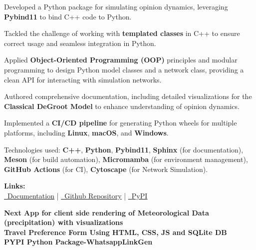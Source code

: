 \documentclass[]{resume}
\begin{document}
\begin{minipage}[t]{0.60\textwidth}
\location{}
\begin{tightemize}
\item Developed a Python package for simulating opinion dynamics, leveraging \textbf{Pybind11} to bind C++ code to Python.
\item Tackled the challenge of working with \textbf{templated classes} in C++ to ensure correct usage and seamless integration in Python.
\item Applied \textbf{Object-Oriented Programming (OOP)} principles and modular programming to design Python model classes and a network class, providing a clean API for interacting with simulation networks.
\item Authored comprehensive documentation, including detailed visualizations for the \textbf{Classical DeGroot Model} to enhance understanding of opinion dynamics.
\item Implemented a \textbf{CI/CD pipeline} for generating Python wheels for multiple platforms, including \textbf{Linux}, \textbf{macOS}, and \textbf{Windows}.
\item Technologies used: \textbf{C++}, \textbf{Python}, \textbf{Pybind11}, \textbf{Sphinx} (for documentation), \textbf{Meson} (for build automation), \textbf{Micromamba} (for environment management), \textbf{GitHub Actions} (for CI), \textbf{Cytoscape} (for Network Simulation).
\item \textbf{Links: } \\
\href{https://seldon-code.github.io/pyseldonlib/}{\faLink\ \underline{Documentation}} | 
\href{https://github.com/seldon-code/pyseldonlib}{\faGithub\ \underline{Github Repository}} | 
\href{https://pypi.org/project/pyseldonlib/}{\faLink\ \underline{PyPI} }
\end{tightemize}
\sectionsep

\small{
\textbf{Next App for client side rendering of Meteorological Data (precipitation) with visualizations \href{https://github.com/User-DK/Demo-Met-Data-vis}{\faGithub}}  \\
\vspace{0.4em}
\textbf{Travel Preference Form Using HTML, CSS, JS and SQLite DB \href{https://github.com/User-DK/Travel-preference-form}{\faGithub}} \\
\vspace{0.4em}
\textbf{PYPI Python Package-WhatsappLinkGen \href{https://pypi.org/project/whatsapplinkgen/}{\faLink}}}
\sectionsep


\end{minipage}
\end{document}

